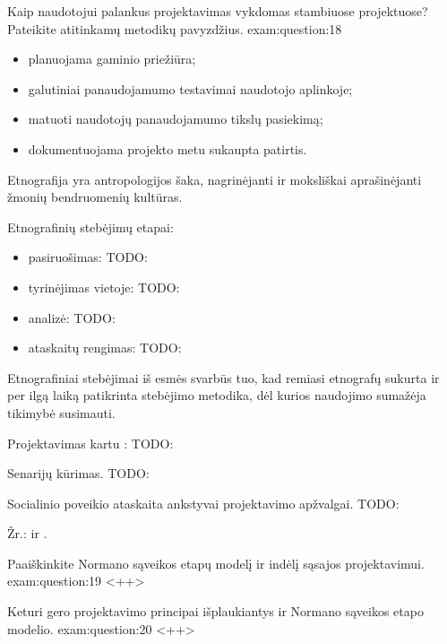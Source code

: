 \begin{question}{%
  Kaip naudotojui palankus projektavimas vykdomas stambiuose projektuose?
  Pateikite atitinkamų metodikų pavyzdžius.
  }{exam:question:18}
\begin{enumerate}
      \begin{itemize}
        \item planuojama gaminio priežiūra;
        \item galutiniai panaudojamumo testavimai naudotojo aplinkoje;
        \item matuoti naudotojų panaudojamumo tikslų pasiekimą;
        \item dokumentuojama projekto metu sukaupta patirtis.
      \end{itemize}
  \end{enumerate}

  Etnografija yra antropologijos šaka, nagrinėjanti ir moksliškai
  aprašinėjanti žmonių bendruomenių kultūras.

  Etnografinių stebėjimų etapai:
  \begin{itemize}
    \item pasiruošimas:
      TODO: \cite[52]{skaidres-7}
    \item tyrinėjimas vietoje:
      TODO: \cite[52]{skaidres-7}
    \item analizė:
      TODO: \cite[53]{skaidres-7}
    \item ataskaitų rengimas:
      TODO: \cite[53]{skaidres-7}
  \end{itemize}
  Etnografiniai stebėjimai iš esmės svarbūs tuo, kad remiasi etnografų
  sukurta ir per ilgą laiką patikrinta stebėjimo metodika, dėl kurios
  naudojimo sumažėja tikimybė susimauti.

  Projektavimas kartu :
  TODO: \cite[55--56]{skaidres-7}

  Senarijų kūrimas. TODO: \cite[57]{skaidres-7}

  Socialinio poveikio ataskaita ankstyvai projektavimo apžvalgai.
  TODO: \cite[58]{skaidres-7}

  Žr.: \cite[36--]{skaidres-7} ir \cite[165--175]{konspektas}.
\end{question}

\begin{question}{%
  Paaiškinkite Normano sąveikos etapų modelį ir indėlį sąsajos
  projektavimui.
  }{exam:question:19}
  <++>
\end{question}

\begin{question}{%
  Keturi gero projektavimo principai išplaukiantys ir Normano sąveikos
  etapo modelio.
  }{exam:question:20}
  <++>
\end{question}
